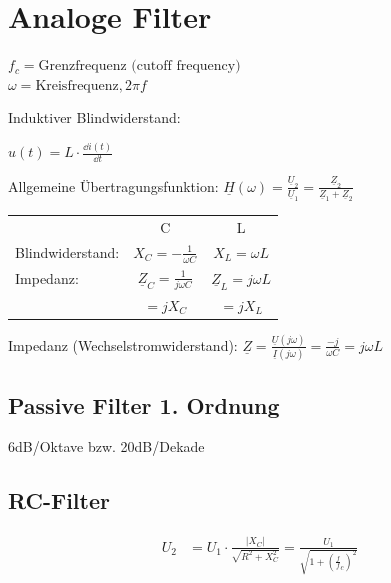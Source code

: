 	
\section{Analoge Filter}

	\begin{symbolbox}
		$ f_c = \text{Grenzfrequenz (cutoff frequency)} $ \\
		$ \omega = \text{Kreisfrequenz}, 2\pi f $
	\end{symbolbox}

Induktiver Blindwiderstand:

$ u(t) = L \cdot \frac{\dd{i(t)}}{\dd{t}} $

\begin{emphbox}
	
	
	Allgemeine Übertragungsfunktion:
	$\underline{H}(\omega) = \frac{\underline{U}_2}{\underline{U}_1} = \frac{\underline{Z}_2}{\underline{Z}_1+\underline{Z}_2} $
	
	
	\begin{tabular}{lcc}
		& C & L \\
		Blindwiderstand: & 		$ {X}_C = -\frac{1}{\omega C} $ & $ {X}_L = \omega L $ \\
		Impedanz: & $ \underline{Z}_C = \frac{1}{j \omega C} $ & $ \underline{Z}_L = j \omega L $ \\
		& $ = jX_C $ & $ = j X_L $
	\end{tabular}
\end{emphbox}

Impedanz (Wechselstromwiderstand): $ \underline{Z} = \frac{\underline{U}(j\omega)}{\underline{I}(j\omega)} = \frac{-j}{\omega C} = j \omega L $


\subsection{Passive Filter 1. Ordnung}

	6dB/Oktave bzw. 20dB/Dekade

	\subsection{RC-Filter}
	
	
	\begin{emphbox}
		\begin{align*}
			U_{2} &=U_{1}\cdot {\frac {\vert X_{C}\vert }{\sqrt {R^{2}+X_{C}^{2}}}}={\frac {U_1}{\sqrt {1+({\frac {f}{f}}_{c})^{2}}}} \\
		\end{align*}
	\end{emphbox}
	
